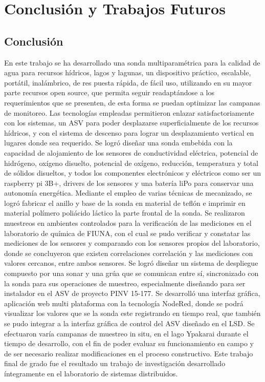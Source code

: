 \chapter[Conclusi\'on y Trabajos Futuros]{ Conclusión y Trabajos Futuros}
\pagestyle{fancy}

\section{Conclusi\'on}
En este trabajo se ha desarrollado una sonda multiparam\'etrica para la calidad de agua para recursos hídricos, lagos y lagunas, un dispositivo pr\'actico, escalable, port\'atil, inal\'ambrico, de res puesta r\'apida, de fácil uso, utilizando en su mayor parte recursos open source, que permita seguir readapt\'andose a los requerimientos que se presenten, de esta forma se puedan optimizar las campanas de monitoreo. 
Las tecnolog\'ias empleadas permitieron enlazar satisfactoriamente con los sistemas, un ASV para poder desplazarse superficialmente de los recursos h\'idricos, y con el sistema de descenso para lograr un desplazamiento vertical en lugares donde sea requerido. 
Se logr\'o dise\~nar una sonda embebida con la capacidad de alojamiento de los sensores de conductividad el\'ectrica, potencial de hidr\'ogeno, ox\'igeno disuelto, potencial de ox\'igeno, reducci\'on, temperatura  y total de s\'olidos disueltos, y todos los componentes electr\'onicos y el\'ectricos como ser un raspberry pi 3B+, drivers de los sensores y una bater\'ia liPo para conservar una autonom\'ia energ\'etica.
Mediante el empleo de varias t\'ecnicas de mecanizado, se logr\'o fabricar el anillo y base de la sonda en material de tefl\'on e imprimir en material pol\'imero poli\'acido l\'actico la parte frontal de la sonda.
Se realizaron muestreos en ambientes controlados para la verificaci\'on de las mediciones en el laboratorio de qu\'imica de FIUNA, con el cual se pudo verificar y constatar las mediciones de los sensores y comparando con los sensores propios del laboratorio, donde se concluyeron que existen correlaciones correlaci\'on y las mediciones con valores cercanos, entre ambos sensores.
Se logr\'o dise\~nar un sistema de despliegue compuesto por una sonar y una gr\'ua que se comunican entre s\'i, sincronizado con la sonda para sus operaciones de muestreo, especialmente dise\~nando para ser instalador en el ASV de proyecto PINV 15-177. 
Se desarroll\'o una interfaz gr\'afica, aplicaci\'on web multi plataforma con la tecnología NodeRed, donde se podrá visualizar los valores que se la sonda este registrando en tiempo real, que también se pudo integrar a la interfaz gráfica de control del ASV diseñado en el LSD.
Se efectuaron varía campanas de muestreo in situ, en el lago Ypakarai durante el tiempo de desarrollo, con el fin de poder evaluar su funcionamiento en campo y de ser necesario realizar modificaciones en el proceso constructivo.
Este trabajo final de grado fue el resultado un trabajo de investigación desarrollado íntegramente en el laboratorio de sistemas distribuidos. 
